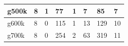 \documentclass[12pt,psfig,a4]{article}
\begin{document}
\begin{table}[ht]
\begin{center}
\begin{tabular}{|l|l|l|l|l|l|l|l|}
g500k& \hspace{0.2in}8 & \hspace{0.2in}1 & \hspace{0.2in}77& \hspace{0.2in}1& \hspace{0.2in}7& \hspace{0.2in}85& \hspace{0.2in}7   \\ \hline 
g600k& \hspace{0.2in}8 & \hspace{0.2in}0 & \hspace{0.2in}115& \hspace{0.2in}1& \hspace{0.2in}13& \hspace{0.2in}129& \hspace{0.2in}10 \\ \hline 
g700k& \hspace{0.2in}8 & \hspace{0.2in}0 & \hspace{0.2in}254& \hspace{0.2in}2& \hspace{0.2in}63& \hspace{0.2in}319& \hspace{0.2in}11 \\ \hline 
\end {tabular}
\end {center}
\end {table}
\normalsize
\newpage
\end{document}
